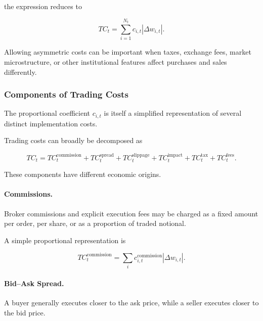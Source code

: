 \documentclass[11pt,a4paper]{article}
\begin{document}
the expression reduces to

\begin{equation}
TC_t
=
\sum_{i=1}^{N_t}
c_{i,t}
|\Delta w_{i,t}|.
\end{equation}

Allowing asymmetric costs can be important when taxes, exchange fees, market
microstructure, or other institutional features affect purchases and sales
differently.


\subsubsection{Components of Trading Costs}

The proportional coefficient $c_{i,t}$ is itself a simplified representation
of several distinct implementation costs.

Trading costs can broadly be decomposed as

\begin{equation}
\boxed{
TC_t
=
TC_t^{\mathrm{commission}}
+
TC_t^{\mathrm{spread}}
+
TC_t^{\mathrm{slippage}}
+
TC_t^{\mathrm{impact}}
+
TC_t^{\mathrm{tax}}
+
TC_t^{\mathrm{fees}}.
}
\end{equation}

These components have different economic origins.

\paragraph{Commissions.}

Broker commissions and explicit execution fees may be charged as a fixed amount
per order, per share, or as a proportion of traded notional.

A simple proportional representation is

\begin{equation}
TC_t^{\mathrm{commission}}
=
\sum_i
c_{i,t}^{\mathrm{commission}}
|\Delta w_{i,t}|.
\end{equation}


\paragraph{Bid--Ask Spread.}

A buyer generally executes closer to the ask price, while a seller executes
closer to the bid price.
\end{document}
